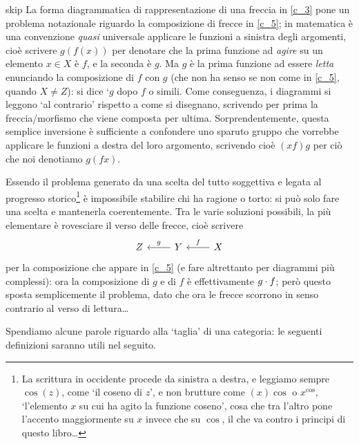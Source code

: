 \begin{hRemark}{skip}\label{sulla_compo}
 La forma diagrammatica di rappresentazione di una freccia in \ref{c_3} pone un problema notazionale riguardo la composizione di frecce in \ref{c_5}; in matematica è una convenzione \emph{quasi} universale applicare le funzioni a sinistra degli argomenti, cioè scrivere \(g(f(x))\) per denotare che la prima funzione ad \emph{agire} su un elemento \(x\in X\) è \(f\), e la seconda è \(g\). Ma \(g\) è la prima funzione ad essere \emph{letta} enunciando la composizione di \(f\) con \(g\) (che non ha senso se non come in \ref{c_5}, quando \(X\ne Z\)): si dice `\(g\) dopo \(f\) o simili. Come conseguenza, i diagrammi si leggono `al contrario' rispetto a come si disegnano, scrivendo per prima la freccia/morfismo che viene composta per ultima.  Sorprendentemente, questa semplice inversione è sufficiente a confondere uno sparuto gruppo che vorrebbe applicare le funzioni a destra del loro argomento, scrivendo cioè \((xf)g\) per ciò che noi denotiamo \(g(fx)\).

 Essendo il problema generato da una scelta del tutto soggettiva e legata al progresso storico\footnote{La scrittura in occidente procede da sinistra a destra, e leggiamo sempre \(\cos(z)\), come `il coseno di \(z\)', e non brutture come \((x)\!\cos\) o \(x^{\cos}\), `l'elemento \(x\) su cui ha agito la funzione coseno', cosa che tra l'altro pone l'accento maggiormente su \(x\) invece che su \(\cos\), il che va contro i principi di questo libro\dots{}} è impossibile stabilire chi ha ragione o torto: si può solo fare una scelta e mantenerla coerentemente. Tra le varie soluzioni possibili, la più elementare è rovesciare il verso delle frecce, cioè scrivere
 \[
  \begin{tikzcd}
   Z
   & Y \ar[l, "g"'] & X \ar[l, "f"']
  \end{tikzcd}
 \]
 per la composizione che appare in \ref{c_5} (e fare altrettanto per diagrammi più complessi): ora la composizione di \(g\) e di \(f\) è effettivamente \(g\cdot f\); però questo sposta semplicemente il problema, dato che ora le frecce scorrono in senso contrario al verso di lettura\dots
\end{hRemark}
Spendiamo alcune parole riguardo alla `taglia' di una categoria: le seguenti definizioni saranno utili nel seguito.
